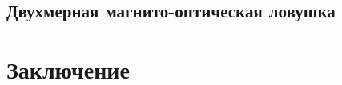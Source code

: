 \unewpage
\subsection{Двухмерная магнито-оптическая ловушка} 












% 









\unewpage
\section{Заключение}




\unewpage
{}




% 